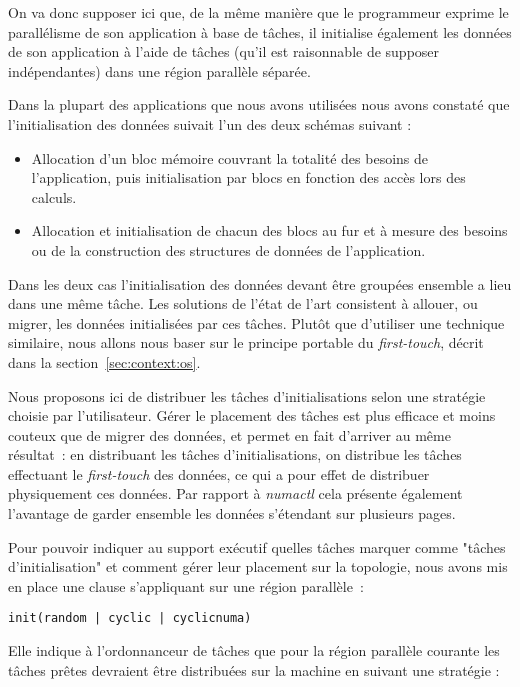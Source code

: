 On va donc supposer ici que, de la même manière que le programmeur exprime le parallélisme de son application à base de tâches, il initialise également les données de son application à l'aide de tâches (qu'il est raisonnable de supposer indépendantes) dans une région parallèle séparée.

Dans la plupart des applications que nous avons utilisées nous avons constaté que l'initialisation des données suivait l'un des deux schémas suivant :
\begin{itemize}
    \item Allocation d'un bloc mémoire couvrant la totalité des besoins de l'application, puis initialisation par blocs en fonction des accès lors des calculs.
  \item Allocation et initialisation de chacun des blocs au fur et à mesure des besoins ou de la construction des structures de données de l'application.
\end{itemize}

Dans les deux cas l'initialisation des données devant être groupées ensemble a lieu dans une même tâche.
Les solutions de l'état de l'art consistent à allouer, ou migrer, les données initialisées par ces tâches.
Plutôt que d'utiliser une technique similaire, nous allons nous baser sur le principe portable du \emph{first-touch}, décrit dans la section~\ref{sec:context:os}.

Nous proposons ici de distribuer les tâches d'initialisations selon une stratégie choisie par l'utilisateur.
Gérer le placement des tâches est plus efficace et moins couteux que de migrer des données, et permet en fait d'arriver au même résultat~: en distribuant les tâches d'initialisations, on distribue les tâches effectuant le \emph{first-touch} des données, ce qui a pour effet de distribuer physiquement ces données.
Par rapport à \emph{numactl} cela présente également l'avantage de garder ensemble les données s'étendant sur plusieurs pages.


Pour pouvoir indiquer au support exécutif quelles tâches marquer comme "tâches d'initialisation" et comment gérer leur placement sur la topologie, nous avons mis en place une clause s'appliquant sur une région parallèle~:

\begin{lstlisting}
init(random | cyclic | cyclicnuma)
\end{lstlisting}

Elle indique à l'ordonnanceur de tâches que pour la région parallèle courante les tâches prêtes devraient être distribuées sur la machine en suivant une stratégie :

